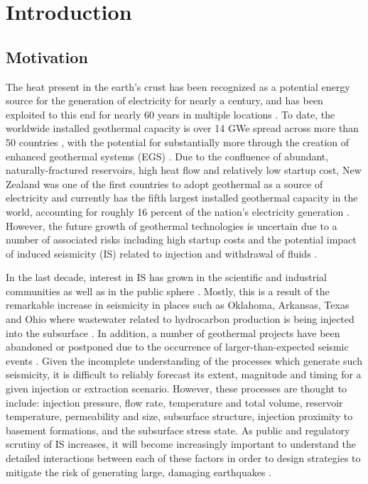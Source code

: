 \chapter{Introduction}
\section{Motivation}
The heat present in the earth's crust has been recognized as a potential energy source for the generation of electricity for nearly a century, and has been exploited to this end for nearly 60 years in multiple locations \citep{Gregg_1958,GARRISON_1972,Minissale_1991}. To date, the worldwide installed geothermal capacity is over 14 GWe spread across more than 50 countries \citep{Pan_2019, Bertani_2016}, with the potential for substantially more through the creation of enhanced geothermal systems (EGS) \citep{Blackwell_2007}. Due to the confluence of abundant, naturally-fractured reservoirs, high heat flow and relatively low startup cost, New Zealand was one of the first countries to adopt geothermal as a source of electricity and currently has the fifth largest installed geothermal capacity in the world, accounting for roughly 16 percent of the nation's electricity generation \citep{Bertani_2016,Grant_2011}. However, the future growth of geothermal technologies is uncertain due to a number of associated risks including high startup costs \citep{Olasolo_2016} and the potential impact of induced seismicity (IS) related to injection and withdrawal of fluids \citep{Majer_2007,Ellsworth_2013}.

In the last decade, interest in IS has grown in the scientific and industrial communities as well as in the public sphere \citep{Ellsworth_2013}. Mostly, this is a result of the remarkable increase in seismicity in places such as Oklahoma, Arkansas, Texas and Ohio where wastewater related to hydrocarbon production is being injected into the subsurface \citep[e.g.][]{Yeck_2017,Horton_2012,Kim_2013,McGarr_2017,Keranen_2013}. In addition, a number of geothermal projects have been abandoned or postponed due to the occurrence of larger-than-expected seismic events \citep[e.g.][]{Deichmann_2009,Grigoli_2018}. Given the incomplete understanding of the processes which generate such seismicity, it is difficult to reliably forecast its extent, magnitude and timing for a given injection or extraction scenario. However, these processes are thought to include: injection pressure, flow rate, temperature and total volume, reservoir temperature, permeability and size, subsurface structure, injection proximity to basement formations, and the subsurface stress state. As public and regulatory scrutiny of IS increases, it will become increasingly important to understand the detailed interactions between each of these factors in order to design strategies to mitigate the risk of generating large, damaging earthquakes \citep[e.g.][]{Langenbruch_2017}.

